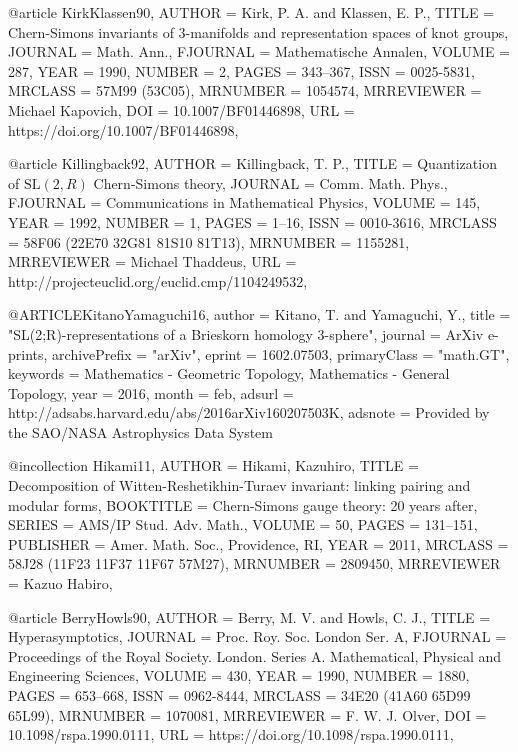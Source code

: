 @article {KirkKlassen90,
    AUTHOR = {Kirk, P. A. and Klassen, E. P.},
     TITLE = {Chern-{S}imons invariants of {$3$}-manifolds and
              representation spaces of knot groups},
   JOURNAL = {Math. Ann.},
  FJOURNAL = {Mathematische Annalen},
    VOLUME = {287},
      YEAR = {1990},
    NUMBER = {2},
     PAGES = {343--367},
      ISSN = {0025-5831},
   MRCLASS = {57M99 (53C05)},
  MRNUMBER = {1054574},
MRREVIEWER = {Michael Kapovich},
       DOI = {10.1007/BF01446898},
       URL = {https://doi.org/10.1007/BF01446898},
}

@article {Killingback92,
    AUTHOR = {Killingback, T. P.},
     TITLE = {Quantization of {$\text{SL}(2,{ R})$} {C}hern-{S}imons
              theory},
   JOURNAL = {Comm. Math. Phys.},
  FJOURNAL = {Communications in Mathematical Physics},
    VOLUME = {145},
      YEAR = {1992},
    NUMBER = {1},
     PAGES = {1--16},
      ISSN = {0010-3616},
   MRCLASS = {58F06 (22E70 32G81 81S10 81T13)},
  MRNUMBER = {1155281},
MRREVIEWER = {Michael Thaddeus},
       URL = {http://projecteuclid.org/euclid.cmp/1104249532},
}

@ARTICLE{KitanoYamaguchi16,
   author = {{Kitano}, T. and {Yamaguchi}, Y.},
    title = "{SL(2;R)-representations of a Brieskorn homology 3-sphere}",
  journal = {ArXiv e-prints},
archivePrefix = "arXiv",
   eprint = {1602.07503},
 primaryClass = "math.GT",
 keywords = {Mathematics - Geometric Topology, Mathematics - General Topology},
     year = 2016,
    month = feb,
   adsurl = {http://adsabs.harvard.edu/abs/2016arXiv160207503K},
  adsnote = {Provided by the SAO/NASA Astrophysics Data System}
}

@incollection {Hikami11,
    AUTHOR = {Hikami, Kazuhiro},
     TITLE = {Decomposition of {W}itten-{R}eshetikhin-{T}uraev invariant:
              linking pairing and modular forms},
 BOOKTITLE = {Chern-{S}imons gauge theory: 20 years after},
    SERIES = {AMS/IP Stud. Adv. Math.},
    VOLUME = {50},
     PAGES = {131--151},
 PUBLISHER = {Amer. Math. Soc., Providence, RI},
      YEAR = {2011},
   MRCLASS = {58J28 (11F23 11F37 11F67 57M27)},
  MRNUMBER = {2809450},
MRREVIEWER = {Kazuo Habiro},
}

@article {BerryHowls90,
    AUTHOR = {Berry, M. V. and Howls, C. J.},
     TITLE = {Hyperasymptotics},
   JOURNAL = {Proc. Roy. Soc. London Ser. A},
  FJOURNAL = {Proceedings of the Royal Society. London. Series A.
              Mathematical, Physical and Engineering Sciences},
    VOLUME = {430},
      YEAR = {1990},
    NUMBER = {1880},
     PAGES = {653--668},
      ISSN = {0962-8444},
   MRCLASS = {34E20 (41A60 65D99 65L99)},
  MRNUMBER = {1070081},
MRREVIEWER = {F. W. J. Olver},
       DOI = {10.1098/rspa.1990.0111},
       URL = {https://doi.org/10.1098/rspa.1990.0111},
}

